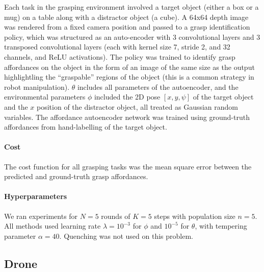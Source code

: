 Each task in the grasping environment involved a target object (either a box or a mug) on a table along with a distractor object (a cube). A 64x64 depth image was rendered from a fixed camera position and passed to a grasp identification policy, which was structured as an auto-encoder with 3 convolutional layers and 3 transposed convolutional layers (each with kernel size 7, stride 2, and 32 channels, and ReLU activations). The policy was trained to identify grasp affordances on the object in the form of an image of the same size as the output highlightling the ``graspable'' regions of the object (this is a common strategy in robot manipulation). $\theta$ includes all parameters of the autoencoder, and the environmental parameters $\phi$ included the 2D pose $[x, y, \psi]$ of the target object and the $x$ position of the distractor object, all treated as Gaussian random variables. The affordance autoencoder network was trained using ground-truth affordances from hand-labelling of the target object.

\paragraph{Cost} The cost function for all grasping tasks was the mean square error between the predicted and ground-truth grasp affordances.

\paragraph{Hyperparameters} We ran experiments for $N=5$ rounds of $K=5$ steps with population size $n=5$. All methods used learning rate $\lambda = 10^{-3}$ for $\phi$ and $10^{-5}$ for $\theta$, with tempering parameter $\alpha = 40$. Quenching was not used on this problem.

\subsection{Drone}

